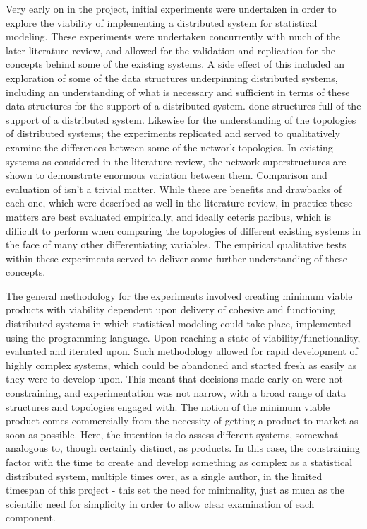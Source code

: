 Very early on in the project, initial experiments were undertaken in order to explore the viability of implementing a distributed system for statistical modeling. 
These experiments were undertaken concurrently with much of the later literature review, and allowed for the validation and replication for the concepts behind some of the existing systems.
A side effect of this included an exploration of some of the data structures underpinning distributed systems, including an understanding of what is necessary and sufficient in terms of these data structures for the support of a distributed system.
done structures full of the support of a distributed system.
Likewise for the understanding of the topologies of distributed systems; the experiments replicated and served to qualitatively examine the differences between some of the network topologies.
In existing systems as considered in the literature review, the network superstructures are shown to demonstrate enormous variation between them.
Comparison and evaluation of isn't a trivial matter.
While there are benefits and drawbacks of each one, which were described as well in the literature review, in practice these matters are best evaluated empirically, and ideally ceteris paribus, which is difficult to perform when comparing the topologies of different existing systems in the face of many other differentiating variables.
The empirical qualitative tests within these experiments served to deliver some further understanding of these concepts.

The general methodology for the experiments involved creating minimum viable products with viability dependent upon delivery of cohesive and functioning distributed systems in which statistical modeling could take place, implemented using the \R programming language.
Upon reaching a state of viability/functionality, evaluated and iterated upon.
Such methodology allowed for rapid development of highly complex systems, which could be abandoned and started fresh as easily as they were to develop upon.
This meant that decisions made early on were not constraining, and experimentation was not narrow, with a broad range of data structures and topologies engaged with.
The notion of the minimum viable product comes commercially from the necessity of getting a product to market as soon as possible.
Here, the intention is do assess different systems, somewhat analogous to, though certainly distinct, as products.
In this case, the constraining factor with the time to create and develop something as complex as a statistical distributed system, multiple times over, as a single author, in the limited timespan of this project - this set the need for minimality, just as much as the scientific need for simplicity in order to allow clear examination of each component.

